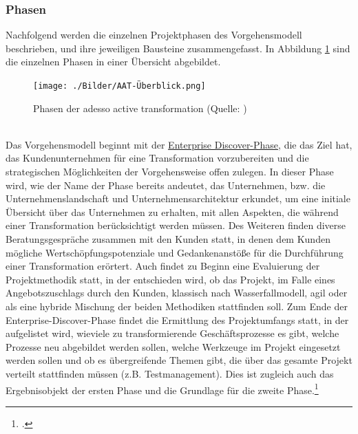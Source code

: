 \subsubsection{Phasen}
Nachfolgend werden die einzelnen Projektphasen des Vorgehensmodell beschrieben, und ihre jeweiligen Bausteine zusammengefasst. In Abbildung \ref{fig:AAT} sind die einzelnen Phasen in einer Übersicht abgebildet.
\begin{figure}[!h]
    \centering
    \texttt{[image: ./Bilder/AAT-Überblick.png]}
    \caption[Phasen des Vorgehensmodell]{Phasen der adesso active transformation (Quelle: \cite[][]{aat-phasen})}
    \label{fig:AAT}
\end{figure}
\\Das Vorgehensmodell beginnt mit der \underline{\glqq{}Enterprise Discover\grqq{}-Phase}, die das Ziel hat, das Kundenunternehmen für eine Transformation vorzubereiten und die strategischen Möglichkeiten der Vorgehensweise offen zulegen. In dieser Phase wird, wie der Name der Phase bereits andeutet, das Unternehmen, bzw. die Unternehmenslandschaft und Unternehmensarchitektur erkundet, um eine initiale Übersicht über das Unternehmen zu erhalten, mit allen Aspekten, die während einer Transformation berücksichtigt werden müssen. Des Weiteren finden diverse Beratungsgespräche zusammen mit den Kunden statt, in denen dem Kunden mögliche Wertschöpfungspotenziale und Gedankenanstöße für die Durchführung einer Transformation erörtert. Auch findet zu Beginn eine Evaluierung der Projektmethodik statt, in der entschieden wird, ob das Projekt, im Falle eines Angebotszuschlags durch den Kunden, klassisch nach Wasserfallmodell, agil oder als eine hybride Mischung der beiden Methodiken stattfinden soll. Zum Ende der Enterprise-Discover-Phase findet die Ermittlung des Projektumfangs statt, in der aufgelistet wird, wieviele zu transformierende Geschäftsprozesse es gibt, welche Prozesse neu abgebildet werden sollen, welche Werkzeuge im Projekt eingesetzt werden sollen und ob es übergreifende Themen gibt, die über das gesamte Projekt verteilt stattfinden müssen (z.B. Testmanagement). Dies ist zugleich auch das Ergebnisobjekt der ersten Phase und die Grundlage für die zweite Phase.\footcite[Vgl.][]{aat-enterprisediscover}\\
\vspace{1em}
